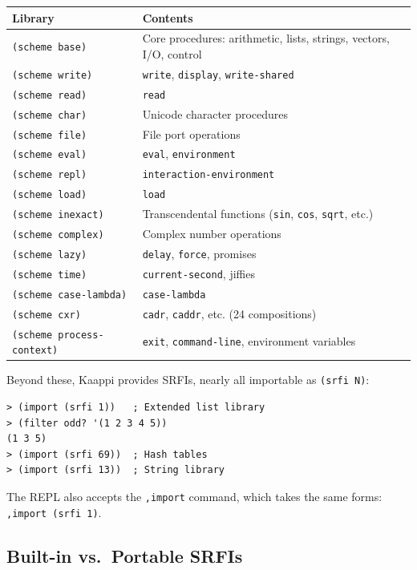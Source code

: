 \begin{center}
\begin{tabular}{lp{6cm}}
\textbf{Library} & \textbf{Contents} \\
\hline
\texttt{(scheme base)} & Core procedures: arithmetic, lists, strings, vectors, I/O, control \\
\texttt{(scheme write)} & \texttt{write}, \texttt{display}, \texttt{write-shared} \\
\texttt{(scheme read)} & \texttt{read} \\
\texttt{(scheme char)} & Unicode character procedures \\
\texttt{(scheme file)} & File port operations \\
\texttt{(scheme eval)} & \texttt{eval}, \texttt{environment} \\
\texttt{(scheme repl)} & \texttt{interaction-environment} \\
\texttt{(scheme load)} & \texttt{load} \\
\texttt{(scheme inexact)} & Transcendental functions (\texttt{sin}, \texttt{cos}, \texttt{sqrt}, etc.) \\
\texttt{(scheme complex)} & Complex number operations \\
\texttt{(scheme lazy)} & \texttt{delay}, \texttt{force}, promises \\
\texttt{(scheme time)} & \texttt{current-second}, jiffies \\
\texttt{(scheme case-lambda)} & \texttt{case-lambda} \\
\texttt{(scheme cxr)} & \texttt{cadr}, \texttt{caddr}, etc. (24 compositions) \\
\texttt{(scheme process-context)} & \texttt{exit}, \texttt{command-line}, environment variables \\
\end{tabular}
\end{center}

Beyond these, Kaappi provides \srfitotal{} SRFIs, nearly all importable as \texttt{(srfi N)}:

\begin{lstlisting}[style=repl]
> (import (srfi 1))   ; Extended list library
> (filter odd? '(1 2 3 4 5))
(1 3 5)
> (import (srfi 69))  ; Hash tables
> (import (srfi 13))  ; String library
\end{lstlisting}

The REPL also accepts the \texttt{,import} command, which takes the same forms: \texttt{,import (srfi 1)}.

\subsection{Built-in vs.\ Portable SRFIs}

